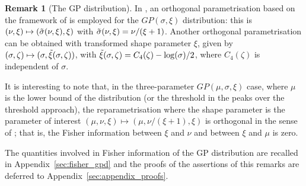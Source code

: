 \documentclass{article}
\newcommand{\1}{\mathds{1}}
\newcommand{\ie}{\emph{i.e.} }
\theoremstyle{definition}
\newtheorem{remark}{Remark}[section]
\begin{document}
\begin{remark}[The GP distribution]\label{rem:GPD} 
In \cite{chavez2005generalized}, an orthogonal  parametrisation  based on the framework of \cite{cox1987parameter} is employed for the $GP(\sigma,\xi)$ distribution: this is  $(\nu,\xi)\mapsto(\Tilde{\sigma}(\nu,\xi),\xi)$ with $\Tilde{\sigma}(\nu,\xi) = \nu/(\xi+1)$. 
Another orthogonal parametrisation can be obtained with transformed shape parameter $\xi$, given by  $(\sigma,\zeta)\mapsto(\sigma,\Tilde{\xi}(\sigma,\zeta))$, with $\Tilde\xi(\sigma,\zeta)=C_4(\zeta)-\log(\sigma)/2$, where $C_4(\zeta)$ is independent of $\sigma$.

It is interesting to note that, in the three-parameter $GP(\mu,\sigma,\xi)$ case, where $\mu$ is the lower bound of the distribution (or the threshold in the peaks over the threshold approach), the reparametrisation where the shape parameter is the parameter of interest $(\mu,\nu,\xi)\mapsto (\mu,\nu/(\xi+1),\xi)$ is orthogonal in the sense of \cite{cox1987parameter}; that is, the Fisher information between $\xi$ and $\nu$ and between $\xi$ and $\mu$ is zero.

The quantities involved in Fisher information of the GP distribution are recalled in Appendix~\ref{sec:fisher_gpd} and the proofs of the assertions of this remarks are deferred to Appendix~\ref{sec:appendix_proofs}.


\end{remark}
\end{document}
